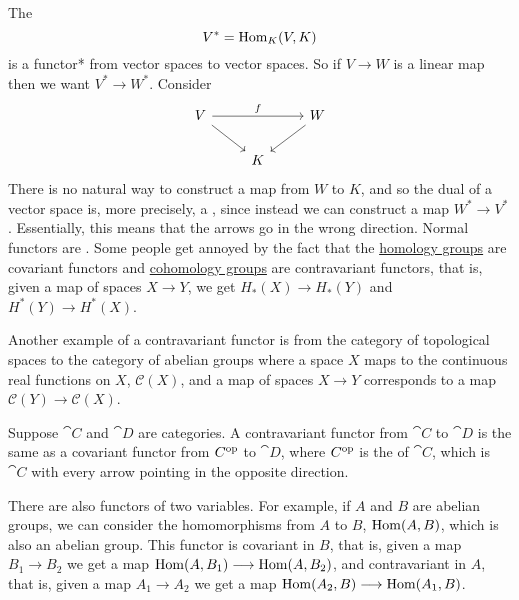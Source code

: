 \documentclass[11pt, oneside]{article}
\begin{document}
The \href{https://en.wikipedia.org/wiki/Dual_space}{}
$$
V^* = \operatorname{Hom}_K(V,K)
$$
is a functor* from vector spaces to vector spaces. So if $V\longrightarrow W$ is a linear map then we want $V^* \longrightarrow W^*$. Consider 
\[
\begin{tikzcd}
V \arrow[rr, "f"] \arrow[dr] && W\arrow[dl] \\ & K &
\end{tikzcd}
\]
There is no natural way to construct a map from $W$ to $K$, and so the dual of a vector space is, more precisely, a \href{https://en.wikipedia.org/wiki/Functor#Covariance_and_contravariance}{}, since instead we can construct a map $W^* \longrightarrow V^*$. Essentially, this means that the arrows go in the wrong direction. Normal functors are \href{https://en.wikipedia.org/wiki/Functor#Covariance_and_contravariance}{}. Some people get annoyed by the fact that the \href{https://en.wikipedia.org/wiki/Homology_(mathematics)}{\color{black}homology groups} are covariant functors and \href{https://en.wikipedia.org/wiki/Cohomology}{\color{black}cohomology groups} are contravariant functors, that is, given a map of spaces $X\longrightarrow Y$, we get $H_*(X) \longrightarrow H_*(Y)$ and $H^*(Y) \longrightarrow H^*(X)$.

Another example of a contravariant functor is from the category of topological spaces to the category of abelian groups where a space $X$ maps to the continuous real functions on $X$, $\mathscr{C}(X)$, and a map of spaces $X\longrightarrow Y$ corresponds to a map  $\mathscr{C}(Y) \longrightarrow \mathscr{C}(X)$.

Suppose $\cat C$ and $\cat D$ are categories. A contravariant functor from $\cat C$ to $\cat D$ is the same as a covariant functor from $ {\relax C}^{\textup {op}}$ to $\cat D$, where $ {\relax C}^{\textup {op}}$ is the \href{https://en.wikipedia.org/wiki/Opposite_category}{} of $\cat C$, which is $\cat C$ with every arrow pointing in the opposite direction.

There are also functors of two variables. For example, if $A$ and $B$ are abelian groups, we can consider the homomorphisms from $A$ to $B$, $\operatorname{Hom}(A,B)$, which is also an abelian group. This functor is covariant in $B$, that is, given a map $B_1 \longrightarrow B_2$ we get a map $\operatorname{Hom}(A,B_1) \longrightarrow \operatorname{Hom}(A,B_2)$, and contravariant in $A$, that is, given a map $A_1\longrightarrow A_2$ we get a map $\operatorname{Hom}(A_2,B)\longrightarrow\operatorname{Hom}(A_1,B)$.
\end{document}
